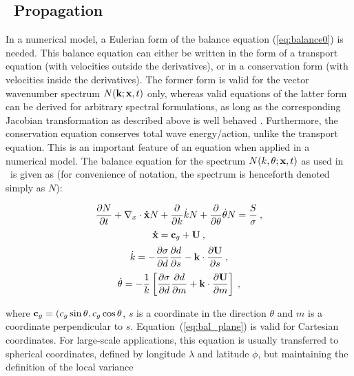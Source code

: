 \vssub
\subsection{~Propagation}
\vssub

In a numerical model, a Eulerian form of the balance equation
(\ref{eq:balance0}) is needed. This balance equation can either be written in
the form of a transport equation (with velocities outside the derivatives), or
in a conservation form (with velocities inside the derivatives). The former
form is valid for the vector wavenumber spectrum $N(\mbox{\bf k};\mbox{\bf x},t)$ only, whereas
valid equations of the latter form can be derived for arbitrary spectral
formulations, as long as the corresponding Jacobian transformation as
described above is well behaved \citep[e.g.,][]{tol:GAOS98b}. Furthermore, the
conservation equation conserves total wave energy/action, unlike the transport
equation. This is an important feature of an equation when applied in a
numerical model. The balance equation for the spectrum $N(k,\theta;\mbox{\bf x},t)$ as
used in \ws\ is given as (for convenience of notation, the spectrum is
henceforth denoted simply as $N$):


\begin{equation}
\frac{\partial N}{\partial t} + \nabla_x \cdot {\bf\dot{x}}N +
\frac{\partial}{\partial k} \dot{k}N +
\frac{\partial}{\partial \theta} \dot{\theta}N =
\frac{S}{\sigma} \: , \label{eq:bal_plane}
\end{equation}
\begin{equation}
{\bf \dot{x}} = {\bf c}_g + {\bf U} \: , \label{eq:x_dot}
\end{equation}
\begin{equation}
\dot{k} = - \frac{\partial \sigma}{\partial d}
\frac{\partial d}{\partial s} - {\bk} \cdot
\frac{\partial {\bf U}}{\partial s} \: , \label{eq:k_dot}
\end{equation}
\begin{equation}
\dot{\theta} = - \frac{1}{k} \left [
\frac{\partial \sigma}{\partial d} \frac{\partial d}{\partial m}
+ {\bk} \cdot \frac{\partial {\bf U}}{\partial m}
\right ] \: , \label{eq:theta_dot}
\end{equation}

\noindent
where ${\bf c}_g = (c_g \sin \theta, c_g \cos \theta$, $s$ is a coordinate in the
direction $\theta$ and $m$ is a coordinate perpendicular to $s$.
Equation~(\ref{eq:bal_plane}) is valid for Cartesian coordinates. For large-scale
applications, this equation is usually transferred to spherical coordinates,
defined by longitude $\lambda$ and latitude $\phi$, but maintaining the
definition of the local variance \citep[i.e., per unit surface, as
in][]{art:WAM88}

